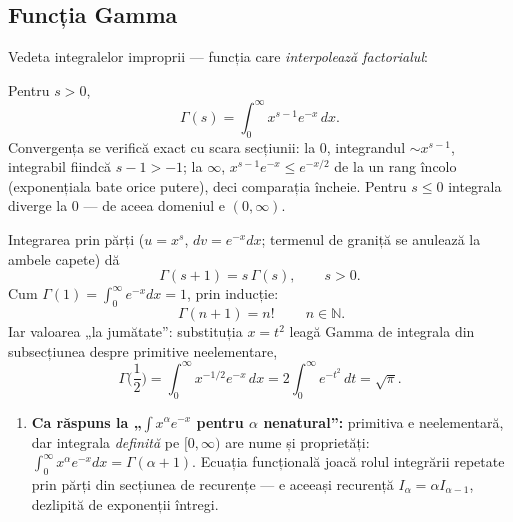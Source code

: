 \subsection{Funcția Gamma}

Vedeta integralelor improprii — funcția care \emph{interpolează factorialul}:

\begin{definitie}
Pentru $s>0$,
\[
\Gamma(s)=\int_0^{\infty}x^{s-1}e^{-x}\,dx.
\]
Convergența se verifică exact cu scara secțiunii: la $0$, integrandul $\sim x^{s-1}$, integrabil fiindcă $s-1>-1$; la $\infty$, $x^{s-1}e^{-x}\le e^{-x/2}$ de la un rang încolo (exponențiala bate orice putere), deci comparația încheie. Pentru $s\le0$ integrala diverge la $0$ — de aceea domeniul e $(0,\infty)$.
\end{definitie}

\begin{teorema}
Integrarea prin părți ($u=x^{s}$, $dv=e^{-x}dx$; termenul de graniță se anulează la ambele capete) dă
\[
\Gamma(s+1)=s\,\Gamma(s),\qquad s>0.
\]
Cum $\Gamma(1)=\int_0^\infty e^{-x}dx=1$, prin inducție:
\[
\boxed{\ \Gamma(n+1)=n!\ }\qquad n\in\mathbb{N}.
\]
Iar valoarea „la jumătate'': substituția $x=t^2$ leagă Gamma de integrala din subsecțiunea despre primitive neelementare,
\[
\Gamma\Big(\frac12\Big)=\int_0^\infty x^{-1/2}e^{-x}\,dx=2\int_0^{\infty}e^{-t^2}\,dt=\sqrt{\pi}.
\]
\end{teorema}

\begin{obs}
\begin{enumerate}[leftmargin=*, itemsep=1pt]
\item \textbf{Ca răspuns la „$\int x^{\alpha}e^{-x}$ pentru $\alpha$ nenatural'':} primitiva e neelementară, dar integrala \emph{definită} pe $[0,\infty)$ are nume și proprietăți: $\int_0^\infty x^{\alpha}e^{-x}dx=\Gamma(\alpha+1)$. Ecuația funcțională joacă rolul integrării repetate prin părți din secțiunea de recurențe --- e aceeași recurență $I_\alpha=\alpha I_{\alpha-1}$, dezlipită de exponenții întregi.
\end{enumerate}
\end{obs}


